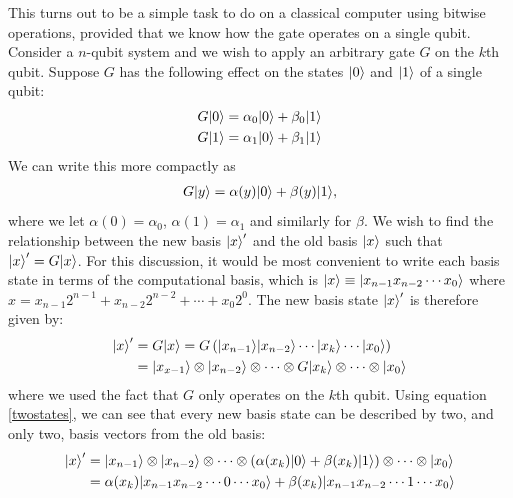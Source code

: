 \documentclass[bibliography=totocnumbered, 10pt]{article}
\theoremstyle{NoticeStyle}
\begin{document}
This turns out to be a simple task to do on a classical computer using bitwise operations, provided that we know how the gate operates on a single qubit. Consider a $n$-qubit system and we wish to apply an arbitrary gate $G$ on the $k$th qubit. Suppose $G$ has the following effect on the states ${\left\vert{0}\right\rangle}$ and ${\left\vert{1}\right\rangle}$ of a single qubit:
\begin{align}
	G{\left\vert{0}\right\rangle} &= \alpha_0 {\left\vert{0}\right\rangle} + \beta_0 {\left\vert{1}\right\rangle}\\
	G{\left\vert{1}\right\rangle} &= \alpha_1 {\left\vert{0}\right\rangle} + \beta_1 {\left\vert{1}\right\rangle}
\end{align} 
We can write this more compactly as
\begin{align}
 G{\left\vert{y}\right\rangle} = \alpha(y){\left\vert{0}\right\rangle} + \beta(y){\left\vert{1}\right\rangle}, \label{twostates}
\end{align}
 where we let $\alpha(0) = \alpha_0$, $\alpha(1) = \alpha_1$ and similarly for $\beta$.
We wish to find the relationship between the new basis ${\left\vert{x}\right\rangle}'$ and the old basis ${\left\vert{x}\right\rangle}$ such that ${\left\vert{x}\right\rangle}' = G{\left\vert{x}\right\rangle}$. For this discussion, it would be most convenient to write each basis state in terms of the computational basis, which is ${\left\vert{x}\right\rangle} \equiv {\left\vert{x_{n-1}x_{n-2}\dotsm x_0}\right\rangle}$ where $x = x_{n-1}2^{n-1} + x_{n-2}2^{n-2} + \dotsb + x_0 2^0$. The new basis state ${\left\vert{x}\right\rangle}'$ is therefore given by:
\begin{align}
	{\left\vert{x}\right\rangle}' &= G{\left\vert{x}\right\rangle} = G\left({\left\vert{x_{n-1}}\right\rangle} {\left\vert{x_{n-2}}\right\rangle} \dotsm {\left\vert{x_k}\right\rangle} \dotsm {\left\vert{x_0}\right\rangle}\right)\\
	&= {\left\vert{x_{x-1}}\right\rangle} \otimes {\left\vert{x_{n-2}}\right\rangle} \otimes \dotsm \otimes G{\left\vert{x_k}\right\rangle} \otimes \dotsm \otimes {\left\vert{x_0}\right\rangle}
\end{align}
where we used the fact that $G$ only operates on the $k$th qubit. Using equation \ref{twostates}, we can see that every new basis state can be described by two, and only two, basis vectors from the old basis:
\begin{align}
	{\left\vert{x}\right\rangle}' &= {\left\vert{x_{n-1}}\right\rangle} \otimes {\left\vert{x_{n-2}}\right\rangle} \otimes \dotsm \otimes \left(\alpha(x_k){\left\vert{0}\right\rangle} + \beta(x_k){\left\vert{1}\right\rangle} \right)  \otimes \dotsm \otimes {\left\vert{x_0}\right\rangle}\\
	&= \alpha(x_k){\left\vert{x_{n-1}x_{n-2}\dotsm 0 \dotsm x_0}\right\rangle} + \beta(x_k){\left\vert{x_{n-1}x_{n-2}\dotsm 1 \dotsm x_0}\right\rangle}
\end{align}
\end{document}
